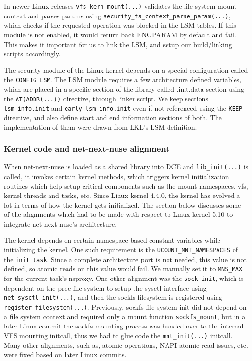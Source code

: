 \documentclass{sig-alternate}
\begin{document}
In newer Linux releases \texttt{vfs\_kern\_mount(...)} validates the file system mount context and parses params using \texttt{security\_fs\_context\_parse\_param(...)},
which checks if the requested operation was blocked in the LSM tables. If this module is not enabled, it would return back ENOPARAM by default and fail. This makes it 
important for us to link the LSM, and setup our build/linking scripts accordingly.

The security module of the Linux kernel depends on a special configuration called the \texttt{CONFIG\_LSM}. The LSM module requires a few architecture
defined variables, which are placed in a specific section
of the library called .init.data section using the \texttt{AT(ADDR(...))} directive, through linker script. 
We keep sections \texttt{lsm\_info.init} and \texttt{early\_lsm\_info.init} even if not referenced using the \texttt{KEEP} directive, 
and also define start and end information sections of both.  The implementation of them were drawn from LKL's LSM definition.

\subsubsection{Kernel code and net-next-nuse alignment}
When net-next-nuse is loaded as a shared library into DCE and \texttt{lib\_init(...)} is called, it invokes certain kernel methods, which triggers 
kernel initialization routines which help setup critical components such as the mount namespaces, vfs, kernel threads and tasks, etc. 
Since Linux kernel 4.4.0, the
kernel has evolved a lot in terms of how the kernel gets initialized. The section below discusses some of the alignments which had to be made with respect to 
Linux kernel 5.10 to integrate net-next-nuse's architecture.

The kernel depends on certain namespace based constant variables while initializing the kernel. One such requirement is the \texttt{UCOUNT\_MNT\_NAMESPACES}
of the \texttt{init\_task}. Since a complete architecture port is not needed, this value is not defined, so atomic reads on this value would fail. 
We manually set it to \texttt{MNS\_MAX} for the current task's nsproxy. One other alignment was the \texttt{sock\_init}, which is dependent on the proc file system  
to setup the sysctl interface using \texttt{net\_sysctl\_init(...)}, and then the sockfs filesystem is registered using \texttt{register\_filesystem(...)}. Previously,
sockfs file system init did not depend on a file system context and required only a mount function \texttt{sockfs\_mount}, but in a later Linux commit the sockfs 
mounting process was handed over to the internal VFS mounting initcall, thus we had to glue code the \texttt{mnt\_init(...)} initcall. Many other alignments, such as,
atomic operations, NAPI atomic read issues, etc. were fixed based on later Linux commits.
\end{document}
